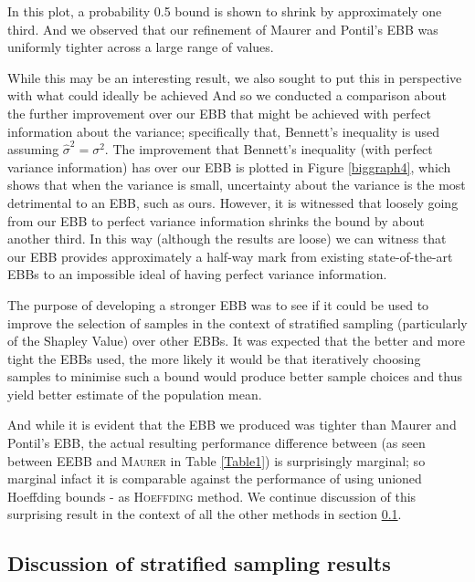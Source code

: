 In this plot, a probability 0.5 bound is shown to shrink by approximately one third.
And we observed that our refinement of Maurer and Pontil's EBB was uniformly tighter across a large range of values.



While this may be an interesting result, we also sought to put this in perspective with what could ideally be achieved
And so we conducted a comparison about the further improvement over our EBB that might be achieved with perfect information about the variance; specifically that, Bennett's inequality is used assuming $\hat{\sigma}^2=\sigma^2$.
The improvement that Bennett's inequality (with perfect variance information) has over our EBB is plotted in Figure \ref{biggraph4}, which shows that when the variance is small, uncertainty about the variance is the most detrimental to an EBB, such as ours.
However, it is witnessed that loosely going from our EBB to perfect variance information shrinks the bound by about another third.
In this way (although the results are loose) we can witness that our EBB provides approximately a half-way mark from existing state-of-the-art EBBs to an impossible ideal of having perfect variance information.

The purpose of developing a stronger EBB was to see if it could be used to improve the selection of samples in the context of stratified sampling (particularly of the Shapley Value) over other EBBs.
It was expected that the better and more tight the EBBs used, the more likely it would be that iteratively choosing samples to minimise such a bound would produce better sample choices and thus yield better estimate of the population mean.

And while it is evident that the EBB we produced was tighter than Maurer and Pontil's EBB, the actual resulting performance difference between (as seen between \textsc{EEBB} and \textsc{Maurer} in Table \ref{Table1}) is surprisingly marginal; so marginal infact it is comparable against the performance of using unioned Hoeffding bounds - as \textsc{Hoeffding} method.
We continue discussion of this surprising result in the context of all the other methods in section \ref{subsection:main_discussion}.



\subsection{Discussion of stratified sampling results}\label{subsection:main_discussion}


